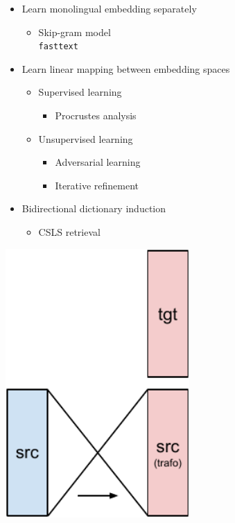 \documentclass[11pt, a4paper, landscape]{article}
\begin{document}
	\vfill


	\NewPage
	\vfill
	\begin{minipage}[b]{.6\linewidth}
		\centering
		\begin{itemize}
			\item Learn monolingual embedding separately
			\begin{itemize}
				\item Skip-gram model \\ \texttt{fasttext} \cite{joulin2016fasttext} 
			\end{itemize}
			\item Learn linear mapping between embedding spaces	
			\begin{itemize}
				\item Supervised learning
				\begin{itemize}
					\item Procrustes analysis
				\end{itemize}
				\item Unsupervised learning
				\begin{itemize}
					\item Adversarial learning
					\item Iterative refinement
				\end{itemize}
			\end{itemize}
			\item Bidirectional dictionary induction
			\begin{itemize}
				\item CSLS retrieval 
			\end{itemize}
			
		\end{itemize}		
	\end{minipage}%
	\begin{minipage}[t]{.4\linewidth}
		\centering 
		\includegraphics[width=7cm]{cross-embed}
	\end{minipage}
	\vfill
\end{document}

